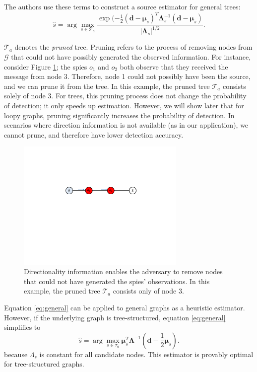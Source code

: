 The authors use these terms to construct a source estimator for general trees:
\begin{equation}
\label{eq:general}
\hat{s} = \arg\max_{s \in \mathcal T_{a}} \dfrac{\exp(-\frac{1}{2} (\boldsymbol{d} - \boldsymbol{\mu}_{s})^{T} \boldsymbol{\Lambda}_s^{-1} (\boldsymbol{d} - \boldsymbol{\mu}_s) }{|\boldsymbol{\Lambda}_s|^{1/2}}.
\end{equation}

$\mathcal T_a$ denotes the \emph{pruned} tree. Pruning refers to the process of removing nodes from $\mathcal G$ that could not have possibly generated the observed information. For instance, consider Figure \ref{fig:pruning}; the spies $o_1$ and $o_2$ both observe that they received the message from node 3. Therefore, node 1 could not possibly have been the source, and we can prune it from the tree. In this example, the pruned tree $\mathcal T_a$ consists solely of node 3. For trees, this pruning process does not change the probability of detection; it only speeds up estimation. However, we will show later that for loopy graphs, pruning significantly increases the probability of detection. In scenarios where direction information is not available (as in our application), we cannot prune, and therefore have lower detection accuracy.

\begin{figure}[h]
\centering
\includegraphics[width = 3.2in]{figures/pruning}
\caption{Directionality information enables the adversary to remove nodes that could not have generated the spies' observations. In this example, the pruned tree $\mathcal T_a$ consists only of node 3.}
\label{fig:pruning}
\end{figure}


Equation \ref{eq:general} can be applied to general graphs as a heuristic estimator. However, if the underlying graph is tree-structured, equation \ref{eq:general} simplifies to
\begin{equation}
\label{eq:tree}
\hat{s} = \arg\max_{s \in \tau_{a}} \boldsymbol{\mu}_{s}^{T} \boldsymbol{\Lambda}^{-1} (\boldsymbol{d} - \frac{1}{2}\boldsymbol{\mu}_s).
\end{equation}
because $\Lambda_s$ is constant for all candidate nodes. This estimator is provably optimal for tree-structured graphs.

